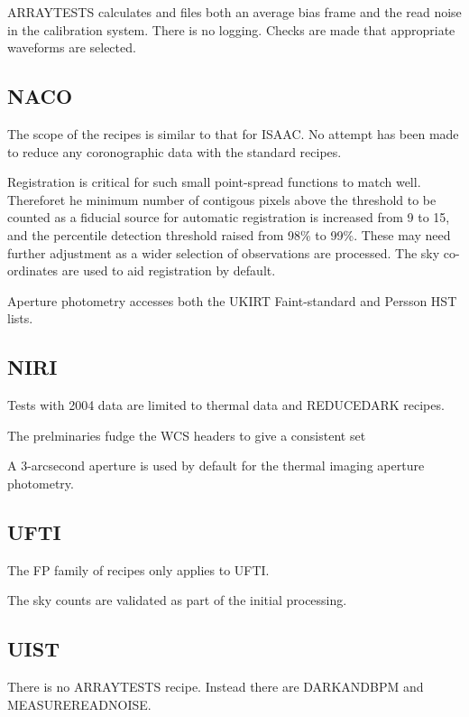 \documentclass[twoside,11pt]{article}
\newcommand{\htmladdnormallink}[2]{#1}
\newcommand{\htmlref}[2]{#1}
\renewcommand{\_}{\texttt{\symbol{95}}}
\newcommand{\NACO}{\htmladdnormallink{NACO}{http://www.eso.org/instruments/naco/}}
\newcommand{\NIRI}{\htmladdnormallink{NIRI}{http://www.gemini.edu/sciops/instruments/niri/}}
\newcommand{\UIST}{\htmladdnormallink{UIST}{http://www.jach.hawaii.edu/JACpublic/UKIRT/instruments/uist/uist.html}}
\newcommand{\UFTI}{\htmladdnormallink{UFTI}{http://www.jach.hawaii.edu/JACpublic/UKIRT/instruments/ufti/ufti.html}}
\begin{document}
\htmlref{ARRAY\_TESTS}{ARRAY\_TESTS} calculates and files both an average
bias frame and the read noise in the calibration system.  There is no logging.
Checks are made that appropriate waveforms are selected.

\subsection{\NACO}
The scope of the recipes is similar to that for \htmlref{ISAAC}{isaac_recipe_notes}.
No attempt has been made to reduce any coronographic data with the
standard recipes.

Registration is critical for such small point-spread functions to
match well.  Thereforet he minimum number of contigous pixels above
the threshold to be counted as a fiducial source for automatic
registration is increased from 9 to 15, and the percentile detection
threshold raised from 98\% to 99\%.  These may need further adjustment
as a wider selection of observations are processed.  The sky
co-ordinates are used to aid registration by default.

Aperture photometry accesses both the UKIRT Faint-standard and Persson
HST lists.

\subsection{\NIRI}
Tests with 2004 data are limited to thermal data and
\htmlref{REDUCE\_DARK}{REDUCE\_DARK} recipes.

The prelminaries fudge the WCS headers to give a consistent set


A 3-arcsecond aperture is used by default for the thermal imaging
aperture photometry.

\subsection{\UFTI}
The \htmlref{FP}{FP} family of recipes only applies to UFTI.

The \htmlref{sky counts are validated}{preliminaries} as part of the
initial processing.

\subsection{\UIST}
There is no ARRAY\_TESTS recipe.  Instead there are 
\htmlref{DARK\_AND\_BPM}{DARK\_AND\_BPM} and \\
\htmlref{MEASURE\_READNOISE}{MEASURE\_READNOISE}.
\end{document}
